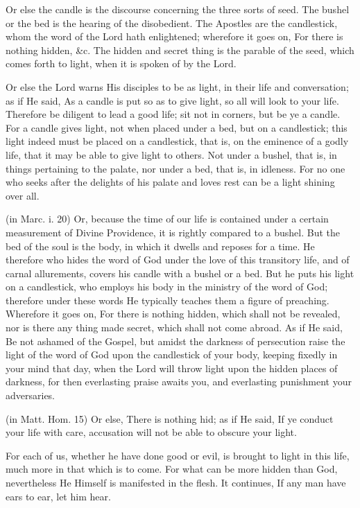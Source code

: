  Or else the candle is the discourse concerning the three sorts of seed. The bushel or the bed is the hearing of the disobedient. The Apostles are the candlestick, whom the word of the Lord hath enlightened; wherefore it goes on, For there is nothing hidden, \&c. The hidden and secret thing is the parable of the seed, which comes forth to light, when it is spoken of by the Lord.

 Or else the Lord warns His disciples to be as light, in their life and conversation; as if He said, As a candle is put so as to give light, so all will look to your life. Therefore be diligent to lead a good life; sit not in corners, but be ye a candle. For a candle gives light, not when placed under a bed, but on a candlestick; this light indeed must be placed on a candlestick, that is, on the eminence of a godly life, that it may be able to give light to others. Not under a bushel, that is, in things pertaining to the palate, nor under a bed, that is, in idleness. For no one who seeks after the delights of his palate and loves rest can be a light shining over all.

 (in Marc. i. 20) Or, because the time of our life is contained under a certain measurement of Divine Providence, it is rightly compared to a bushel. But the bed of the soul is the body, in which it dwells and reposes for a time. He therefore who hides the word of God under the love of this transitory life, and of carnal allurements, covers his candle with a bushel or a bed. But he puts his light on a candlestick, who employs his body in the ministry of the word of God; therefore under these words He typically teaches them a figure of preaching. Wherefore it goes on, For there is nothing hidden, which shall not be revealed, nor is there any thing made secret, which shall not come abroad. As if He said, Be not ashamed of the Gospel, but amidst the darkness of persecution raise the light of the word of God upon the candlestick of your body, keeping fixedly in your mind that day, when the Lord will throw light upon the hidden places of darkness, for then everlasting praise awaits you, and everlasting punishment your adversaries.

 (in Matt. Hom. 15) Or else, There is nothing hid; as if He said, If ye conduct your life with care, accusation will not be able to obscure your light.

 For each of us, whether he have done good or evil, is brought to light in this life, much more in that which is to come. For what can be more hidden than God, nevertheless He Himself is manifested in the flesh. It continues, If any man have ears to ear, let him hear.

